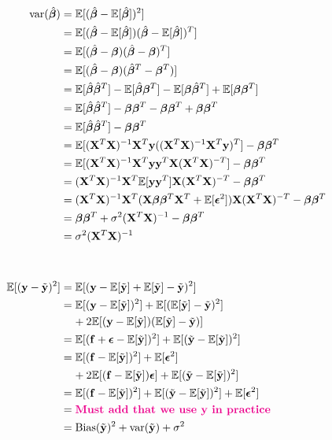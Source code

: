 \begin{align*}
    \text{var}(\hat{\bet}) & = \fv{(\hat{\bet}-\fv{\hat{\bet}})^2} \\
    & = \fv{(\hat{\bet}-\fv{\hat{\bet}})(\hat{\bet}-\fv{\hat{\bet}})^T} \\ 
    & = \fv{(\hat{\bet}-\bet)(\hat{\bet}-\bet)^T} \\ 
    & = \fv{(\hat{\bet}-\bet)(\hat{\bet}^T-\bet^T)} \\
    & = \fv{\hat{\bet}\hat{\bet}^T} - \fv{\hat{\bet}\bet^T} - \fv{\bet \hat{\bet}^T} + \fv{\bet \bet^T} \\
    & = \fv{\hat{\bet}\hat{\bet}^T} - \bet\bet^T - \bet\bet^T + \bet\bet^T \\
    & = \fv{\hat{\bet}\hat{\bet}^T} - \bet\bet^T \\
    & = \fv{\betta(\betta)^T} - \bet\bet^T \\
    & = \fv{\betta \y^T \mathbf{X}(\mathbf{X}^T\mathbf{X})^{-T}} - \bet\bet^T \\
    & = (\mathbf{X}^T\mathbf{X})^{-1}\mathbf{X}^T\fv{\y\y^T}\mathbf{X}(\mathbf{X}^T\mathbf{X})^{-T} - \bet\bet^T \\
    & = (\mathbf{X}^T\mathbf{X})^{-1}\mathbf{X}^T(\mathbf{X}\bet \bet^T \mathbf{X}^T + \fv{\boldsymbol{\epsilon}^2})\mathbf{X}(\mathbf{X}^T\mathbf{X})^{-T} - \bet\bet^T \\
    & = \bet \bet^T + \sigma^2 (\mathbf{X}^T\mathbf{X})^{-1} - \bet \bet^T \\
    & = \sigma^2 (\mathbf{X}^T\mathbf{X})^{-1}
    &  \\
    &  \\
    &  \\
    \fv{(\mathbf{y}-\yt)^2} & = \fv{(\mathbf{y} - \fv{\yt} + \fv{\yt} -\yt)^2} \\
    & = \fv{(\mathbf{y} - \fv{\yt})^2} + \fv{(\fv{\yt} -\yt)^2} \\
    & \;\;\;\; + 2\fv{(\mathbf{y} - \fv{\yt})(\fv{\yt} -\yt)} \\
    & = \fv{(\mathbf{f} + \boldsymbol{\epsilon} - \fv{\yt})^2} + \fv{(\yt - \fv{\yt})^2} \\
    & = \fv{(\mathbf{f}-\fv{\yt})^2}+\fv{\boldsymbol{\epsilon}^2} \\
    & \;\;\;\; + 2\fv{(\mathbf{f}-\fv{\yt})\boldsymbol{\epsilon}} + \fv{(\yt - \fv{\yt})^2}  \\
    & = \fv{(\mathbf{f}-\fv{\yt})^2} + \fv{(\yt - \fv{\yt})^2} +\fv{\boldsymbol{\epsilon}^2}\\
    & = \mia{Must add that we use y in practice} \\
    & = \text{Bias}(\yt)^2 + \text{var}(\yt) + \sigma^2
\end{align*}

